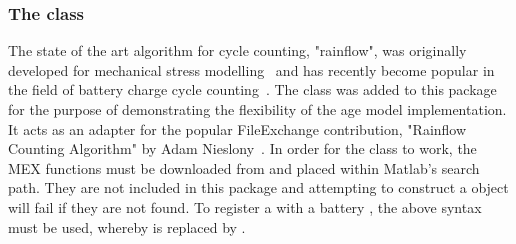 \subsubsection{The  class}
The state of the art algorithm for cycle counting, "rainflow", was originally developed for mechanical stress modelling~\cite{matsuishi_fatigue_1968} and has recently become popular in the field of battery charge cycle counting~\cite{dufo-lopez_multi-objective_2008}. The  class was added to this package for the purpose of demonstrating the flexibility of the age model implementation. It acts as an adapter for the popular FileExchange contribution, "Rainflow Counting Algorithm" by Adam Nieslony~\cite{_rainflow_????}. In order for the class to work, the MEX functions must be downloaded from \cite{_rainflow_????} and placed within Matlab's search path. They are not included in this package and attempting to construct a  object will fail if they are not found. To register a  with a battery , the above syntax must be used, whereby  is replaced by .

